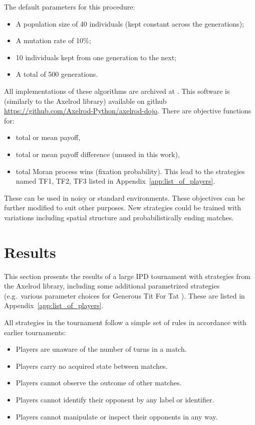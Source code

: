 \documentclass[10pt,letterpaper]{article}
\begin{document}
The default parameters for this procedure:

\begin{itemize}
	\item A population size of 40 individuals (kept constant across the
        generations);
	\item A mutation rate of 10\%;
	\item 10 individuals kept from one generation to the next;
    \item A total of 500 generations.
\end{itemize}

All implementations of these algorithms are archived at
\cite{dojo}. This software is (similarly to the Axelrod
library) available on github
\url{https://github.com/Axelrod-Python/axelrod-dojo}. There are objective
functions for:

\begin{itemize}
 \item total or mean payoff,
 \item total or mean payoff difference (unused in this work),
 \item total Moran process wins (fixation probability). This lead to the
     strategies named TF1, TF2, TF3 listed in
     Appendix~\ref{app:list_of_players}.
\end{itemize}

These can be used in noisy or standard environments. These objectives can be
further modified to suit other purposes. New strategies could be trained with
variations including spatial structure and probabilistically ending matches.

\section*{Results}

This section presents the results of a large IPD tournament with
strategies from the Axelrod library, including some additional parametrized
strategies (e.g.\ various parameter choices for Generous Tit For Tat
\cite{Gaudesi2016}). These are
listed in Appendix~\ref{app:list_of_players}.

All strategies in the tournament follow a simple set of
rules in accordance with earlier tournaments:

\begin{itemize}
  \item Players are unaware of the number of turns in a match.
  \item Players carry no acquired state between matches.
  \item Players cannot observe the outcome of other matches.
  \item Players cannot identify their opponent by any label or identifier.
  \item Players cannot manipulate or inspect their opponents in any way.
\end{itemize}
\end{document}
